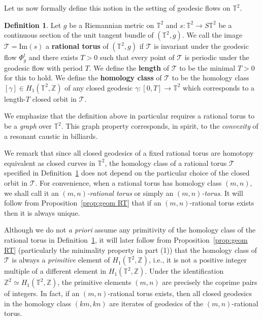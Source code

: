 \documentclass[11pt,letterpaper,oneside]{amsart}
\newcommand{\Z}{\mathbb{Z}}
\newcommand{\T}{\mathbb{T}}
\newcommand{\im}{\text{Im}}
\theoremstyle{definition}
\newtheorem{def1}[theo]{Definition}
\theoremstyle{remark}
\theoremstyle{definition}
\theoremstyle{remark}
\newcommand{\CT}{\mathcal{T}}
\begin{document}
\medskip

Let us now formally define this notion in the setting of geodesic flows on $\T^2$.

\begin{def1}\label{def:RT}
    Let $g$ be a Riemannian metric on $\T^2$ and $s: \T^2 \to S\T^2$ be a continuous section of the unit tangent bundle of $(\T^2, g)$. 
    We call the image $\CT = \im(s)$ a \textbf{rational torus} of $(\T^2, g)$ if $\CT$ is invariant under the geodesic flow $\Phi^t_g$ and there exists $T > 0$ such that every point of $\CT$ is periodic under the geodesic flow with period $T$.
    We define the \textbf{length} of $\CT$ to be the minimal $T > 0$ for this to hold.
    We define the \textbf{homology class} of $\CT$ to be the homology class $[\gamma] \in H_1(\T^2, \Z)$ of any closed geodesic $\gamma:[0,T] \to \T^2$ which corresponds to a length-$T$ closed orbit in $\CT$.
\end{def1}

We emphasize that the definition above in particular requires a rational torus to be a \emph{graph} over $\T^2$. 
This graph property corresponds, in spirit, to the \emph{convexity} of a resonant caustic in billiards.

\medskip

We remark that since all closed geodesics of a fixed rational torus are homotopy equivalent as closed curves in $\T^2$, the homology class of a rational torus $\CT$ specified in Definition~\ref{def:RT} does not depend on the particular choice of the closed orbit in $\CT$.
For convenience, when a rational torus has homology class $(m,n)$, we shall call it an \emph{$(m,n)$-rational torus} or simply an \emph{$(m,n)$-torus}.
It will follow from Proposition~\ref{prop:geom RT} that if an $(m,n)$-rational torus exists then it is always unique.


\medskip

Although we do not \emph{a priori} assume any primitivity of the homology class of the rational torus in Definition~\ref{def:RT}, it will later follow from Proposition~\ref{prop:geom RT} (particularly the minimality property in part (1)) that the homology class of $\CT$ is always a \emph{primitive} element of $H_1(\T^2, \Z)$, i.e., it is not a positive integer multiple of a different element in $H_1(\T^2, \Z)$.
Under the identification $\Z^2 \simeq H_1(\T^2, \Z)$, the primitive elements $(m,n)$ are precisely the coprime pairs of integers.
In fact, if an $(m,n)$-rational torus exists, then all closed geodesics in the homology class $(km,kn)$ are iterates of geodesics of the $(m,n)$-rational torus.
\end{document}
